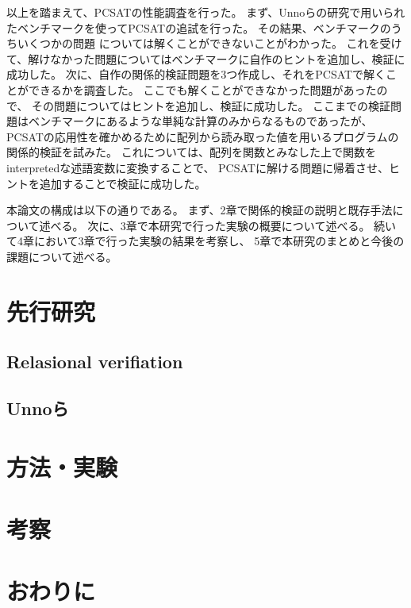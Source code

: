 \documentclass[uplatex]{suribt}
\begin{document}
以上を踏まえて、PCSATの性能調査を行った。
まず、Unnoらの研究で用いられたベンチマークを使ってPCSATの追試を行った。
その結果、ベンチマークのうちいくつかの問題 %
については解くことができないことがわかった。
これを受けて、解けなかった問題についてはベンチマークに自作のヒントを追加し、検証に成功した。
次に、自作の関係的検証問題を3つ作成し、それをPCSATで解くことができるかを調査した。
ここでも解くことができなかった問題があったので、%
その問題についてはヒントを追加し、検証に成功した。
ここまでの検証問題はベンチマークにあるような単純な計算のみからなるものであったが、
PCSATの応用性を確かめるために配列から読み取った値を用いるプログラムの関係的検証を試みた。
これについては、配列を関数とみなした上で関数をinterpretedな述語変数に変換することで、
PCSATに解ける問題に帰着させ、ヒントを追加することで検証に成功した。

本論文の構成は以下の通りである。
まず、2章で関係的検証の説明と既存手法について述べる。
次に、3章で本研究で行った実験の概要について述べる。
続いて4章において3章で行った実験の結果を考察し、
5章で本研究のまとめと今後の課題について述べる。

\chapter{先行研究}
\section{Relasional verifiation}
\section{Unnoら}

\chapter{方法・実験}
\chapter{考察}
\chapter{おわりに}

\backmatter%



\end{document}
